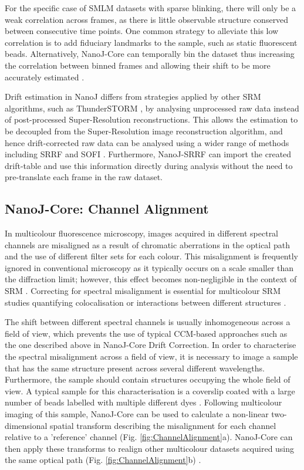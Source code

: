  For the specific case of SMLM datasets with sparse blinking, there will only be a weak correlation across frames, as there is little observable structure conserved between consecutive time points. One common strategy to alleviate this low correlation is to add fiduciary landmarks to the sample, such as static fluorescent beads. Alternatively, NanoJ-Core can temporally bin the dataset thus increasing the correlation between binned frames and allowing their shift to be more accurately estimated \cite{mlodzianoski2011sample}. 

 Drift estimation in NanoJ differs from strategies applied by other SRM algorithms, such as ThunderSTORM \cite{ovesny2014thunderstorm}, by analysing unprocessed raw data instead of post-processed Super-Resolution reconstructions. This allows the estimation to be decoupled from the Super-Resolution image reconstruction algorithm, and hence drift-corrected raw data can be analysed using a wider range of methods including SRRF and SOFI \cite{dertinger2009fast}. Furthermore, NanoJ-SRRF can import the created drift-table and use this information directly during analysis without the need to pre-translate each frame in the raw dataset.

\subsection*{NanoJ-Core: Channel Alignment}

In multicolour fluorescence microscopy, images acquired in different spectral channels are misaligned as a result of chromatic aberrations in the optical path and the use of different filter sets for each colour. This misalignment is frequently ignored in conventional microscopy as it typically occurs on a scale smaller than the diffraction limit; however, this effect becomes non-negligible in the context of SRM \cite{erdelyi2013correcting}. Correcting for spectral misalignment is essential for multicolour SRM studies quantifying colocalisation or interactions between different structures \cite{bock2007two,van2009multicolor,niekamp2017high}. 
 
 The shift between different spectral channels is usually inhomogeneous across a field of view, which prevents the use of typical CCM-based approaches such as the one described above in NanoJ-Core Drift Correction. In order to characterise the spectral misalignment across a field of view, it is necessary to image a sample that has the same structure present across several different wavelengths. Furthermore, the sample should contain structures occupying the whole field of view. A typical sample for this characterisation is a coverslip coated with a large number of beads labelled with multiple different dyes \cite{Demmerle2017}. Following multicolour imaging of this sample, NanoJ-Core can be used to calculate a non-linear two-dimensional spatial transform describing the misalignment for each channel relative to a 'reference' channel (Fig. \ref{fig:ChannelAlignment}a). NanoJ-Core can then apply these transforms to realign other multicolour datasets acquired using the same optical path (Fig. \ref{fig:ChannelAlignment}b) \cite{arganda2006consistent,annibale2012identification}. 
 
